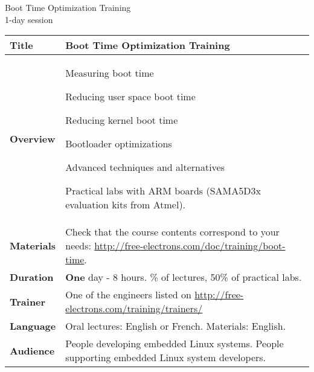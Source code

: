 \documentclass[a4paper,12pt,obeyspaces,spaces,hyphens]{article}
\begin{document}
\thispagestyle{fancy}

\setlength{\arrayrulewidth}{0.8pt}

\begin{center}
\LARGE
Boot Time Optimization Training\\
\large
1-day session
\end{center}
\vspace{1cm}

\small
{}

 {
  \begin{tabularx}{\textwidth}{|g|h|}
    {\bf Title} & {\bf Boot Time Optimization Training}\\
    \hline

    {\bf Overview} &
    Measuring boot time \par
    Reducing user space boot time \par
    Reducing kernel boot time \par
    Bootloader optimizations \par
    Advanced techniques and alternatives \par
    Practical labs with ARM boards (SAMA5D3x evaluation kits from Atmel).\\
    \hline
    {\bf Materials} &
    Check that the course contents correspond to your needs:
    \newline \url{http://free-electrons.com/doc/training/boot-time}. \\
    \hline

    {\bf Duration} & {\bf One} day - 8 hours.
    \% of lectures, 50\% of practical labs. \\
    \hline

    {\bf Trainer} & One of the engineers listed on
    \newline \url{http://free-electrons.com/training/trainers/}\\
    \hline

    {\bf Language} & Oral lectures: English or French.
    \newline Materials: English.\\
    \hline

    {\bf Audience} & People developing embedded Linux systems.
    \newline People supporting embedded Linux system developers. \\
    \hline


\end{tabularx}}
\end{document}
